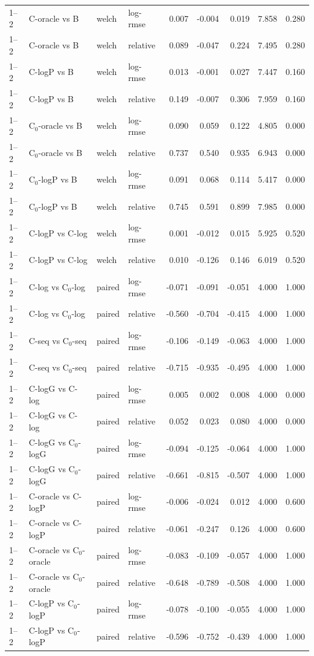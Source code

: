 \begin{longtable}{llllrrrrr}
1–2 & C-oracle vs B & welch & log-rmse & 0.007 & -0.004 & 0.019 & 7.858 & 0.280 \\
1–2 & C-oracle vs B & welch & relative & 0.089 & -0.047 & 0.224 & 7.495 & 0.280 \\
1–2 & C-logP vs B & welch & log-rmse & 0.013 & -0.001 & 0.027 & 7.447 & 0.160 \\
1–2 & C-logP vs B & welch & relative & 0.149 & -0.007 & 0.306 & 7.959 & 0.160 \\
1–2 & C$_0$-oracle vs B & welch & log-rmse & 0.090 & 0.059 & 0.122 & 4.805 & 0.000 \\
1–2 & C$_0$-oracle vs B & welch & relative & 0.737 & 0.540 & 0.935 & 6.943 & 0.000 \\
1–2 & C$_0$-logP vs B & welch & log-rmse & 0.091 & 0.068 & 0.114 & 5.417 & 0.000 \\
1–2 & C$_0$-logP vs B & welch & relative & 0.745 & 0.591 & 0.899 & 7.985 & 0.000 \\
1–2 & C-logP vs C-log & welch & log-rmse & 0.001 & -0.012 & 0.015 & 5.925 & 0.520 \\
1–2 & C-logP vs C-log & welch & relative & 0.010 & -0.126 & 0.146 & 6.019 & 0.520 \\
1–2 & C-log vs C$_0$-log & paired & log-rmse & -0.071 & -0.091 & -0.051 & 4.000 & 1.000 \\
1–2 & C-log vs C$_0$-log & paired & relative & -0.560 & -0.704 & -0.415 & 4.000 & 1.000 \\
1–2 & C-seq vs C$_0$-seq & paired & log-rmse & -0.106 & -0.149 & -0.063 & 4.000 & 1.000 \\
1–2 & C-seq vs C$_0$-seq & paired & relative & -0.715 & -0.935 & -0.495 & 4.000 & 1.000 \\
1–2 & C-logG vs C-log & paired & log-rmse & 0.005 & 0.002 & 0.008 & 4.000 & 0.000 \\
1–2 & C-logG vs C-log & paired & relative & 0.052 & 0.023 & 0.080 & 4.000 & 0.000 \\
1–2 & C-logG vs C$_0$-logG & paired & log-rmse & -0.094 & -0.125 & -0.064 & 4.000 & 1.000 \\
1–2 & C-logG vs C$_0$-logG & paired & relative & -0.661 & -0.815 & -0.507 & 4.000 & 1.000 \\
1–2 & C-oracle vs C-logP & paired & log-rmse & -0.006 & -0.024 & 0.012 & 4.000 & 0.600 \\
1–2 & C-oracle vs C-logP & paired & relative & -0.061 & -0.247 & 0.126 & 4.000 & 0.600 \\
1–2 & C-oracle vs C$_0$-oracle & paired & log-rmse & -0.083 & -0.109 & -0.057 & 4.000 & 1.000 \\
1–2 & C-oracle vs C$_0$-oracle & paired & relative & -0.648 & -0.789 & -0.508 & 4.000 & 1.000 \\
1–2 & C-logP vs C$_0$-logP & paired & log-rmse & -0.078 & -0.100 & -0.055 & 4.000 & 1.000 \\
1–2 & C-logP vs C$_0$-logP & paired & relative & -0.596 & -0.752 & -0.439 & 4.000 & 1.000 \\
\end{longtable}
\endgroup
